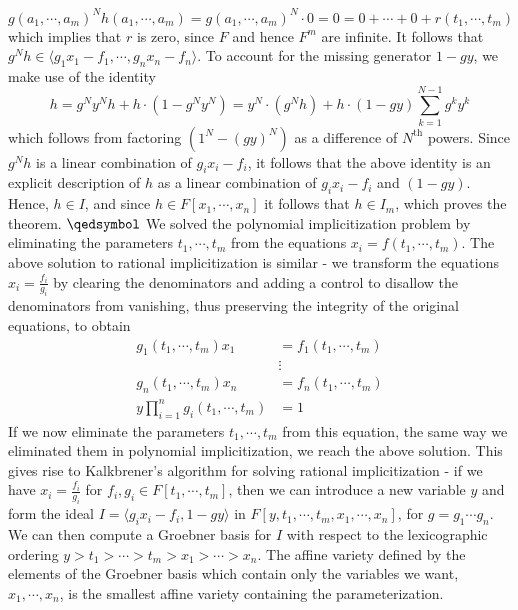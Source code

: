 \documentclass{article}
\begin{document}
$$ g(a_1, \cdots, a_m)^N h(a_1, \cdots, a_m) = g(a_1, \cdots, a_m)^N \cdot 0 = 0 = 0 + \cdots + 0 + r(t_1, \cdots, t_m) $$
which implies that $ r $ is zero, since $ F $ and hence $ F^m $ are infinite.
\newline
\indent It follows that $ g^N h \in \langle g_1 x_1 - f_1, \cdots, g_n x_n - f_n \rangle $. To account for the missing generator $ 1 - g y $, we make use of the identity
$$ h = g^N y^N h + h \cdot (1 - g^N y^N) = y^N \cdot (g^N h) + h \cdot (1 - g y) \sum_{k = 1}^{N - 1} g^k y^k $$
which follows from factoring $ (1^N - (g y)^N) $ as a difference of $ N^{\text{th}} $ powers. Since $ g^N h $ is a linear combination of $ g_i x_i - f_i $, it follows that the above identity is an explicit description of $ h $ as a linear combination of $ g_i x_i - f_i $ and $ (1 - g y) $. Hence, $ h \in I $, and since $ h \in F[x_1, \cdots, x_n] $ it follows that $ h \in I_m $, which proves the theorem. $ \qedsymbol $
\newline \newline
We solved the polynomial implicitization problem by eliminating the parameters $ t_1, \cdots, t_m $ from the equations $ x_i = f(t_1, \cdots, t_m) $. The above solution to rational implicitization is similar - we transform the equations $ x_i = \frac{f_i}{g_i} $ by clearing the denominators and adding a control to disallow the denominators from vanishing, thus preserving the integrity of the original equations, to obtain
$$ \begin{aligned}
	g_1(t_1, \cdots, t_m) x_1 &= f_1(t_1, \cdots, t_m) \\
	& \vdots \\
	g_n(t_1, \cdots, t_m) x_n &= f_n(t_1, \cdots, t_m) \\
	y \prod_{i = 1}^n g_i(t_1, \cdots, t_m) &= 1
\end{aligned} $$
If we now eliminate the parameters $ t_1, \cdots, t_m $ from this equation, the same way we eliminated them in polynomial implicitization, we reach the above solution. This gives rise to Kalkbrener's algorithm for solving rational implicitization - if we have $ x_i = \frac{f_i}{g_i} $ for $ f_i, g_i \in F[t_1, \cdots, t_m] $, then we can introduce a new variable $ y $ and form the ideal $ I = \langle g_i x_i - f_i, 1 - g y \rangle $ in $ F[y, t_1, \cdots, t_m, x_1, \cdots, x_n] $, for $ g = g_1 \cdots g_n $. We can then compute a Groebner basis for $ I $ with respect to the lexicographic ordering $ y > t_1 > \cdots > t_m > x_1 > \cdots > x_n $. The affine variety defined by the elements of the Groebner basis which contain only the variables we want, $ x_1, \cdots, x_n $, is the smallest affine variety containing the parameterization.
\end{document}
